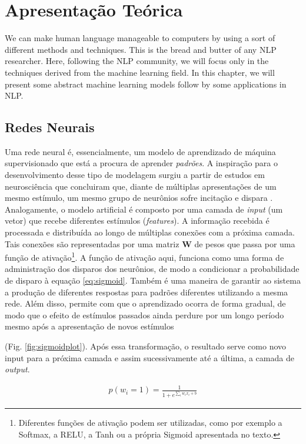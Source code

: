 \chapter{Apresentação Teórica}
\label{ch:02-background}

We can make human language manageable to computers by using a sort of different methods and techniques. This is the bread and butter of any NLP researcher. Here, following the NLP community, we will focus only in the techniques derived from the machine learning field. In this chapter, we will present some abstract machine learning models follow by some applications in NLP. 

\section{Redes Neurais}

Uma rede neural é, essencialmente, um modelo de aprendizado de máquina supervisionado %
que está a procura de aprender \textit{padrões}. A inspiração para o desenvolvimento desse tipo de modelagem surgiu a partir de estudos em neurosciência %
que concluiram que, diante de múltiplas apresentações de um mesmo estímulo, um mesmo grupo de neurônios sofre incitação e dispara%
.  Analogamente, o modelo artificial é composto por uma camada de \textit{input} (um vetor) que recebe diferentes estímulos (\textit{features}). A informação recebida é processada e distribuída ao longo de múltiplas conexões com a próxima camada. Tais conexões são representadas por uma matriz \textbf{W} de pesos que passa por uma função de ativação\footnote{Diferentes funções de ativação podem ser utilizadas, como por exemplo a Softmax, a RELU, a Tanh ou a própria Sigmoid apresentada no texto.}. A função de ativação aqui, funciona como uma forma de administração dos disparos dos neurônios, de modo a condicionar a probabilidade de disparo à equação \ref{eq:sigmoid}. Também é uma maneira de garantir ao sistema a produção de diferentes respostas para padrões diferentes utilizando a mesma rede. Além disso, permite com que o aprendizado ocorra de forma gradual, de modo que o efeito de estímulos passados ainda perdure por um longo período mesmo após a apresentação de novos estímulos 

(Fig. \ref{fig:sigmoidplot}). Após essa transformação, o resultado serve como novo input para a próxima camada e assim sucessivamente até a última, a camada de \textit{output}.

\begin{align}\label{eq:sigmoid}
p(w_{i} = 1) = \frac{1}{1+e^{\sum_{i} w_{i}x_{i} + b}}
\end{align}

